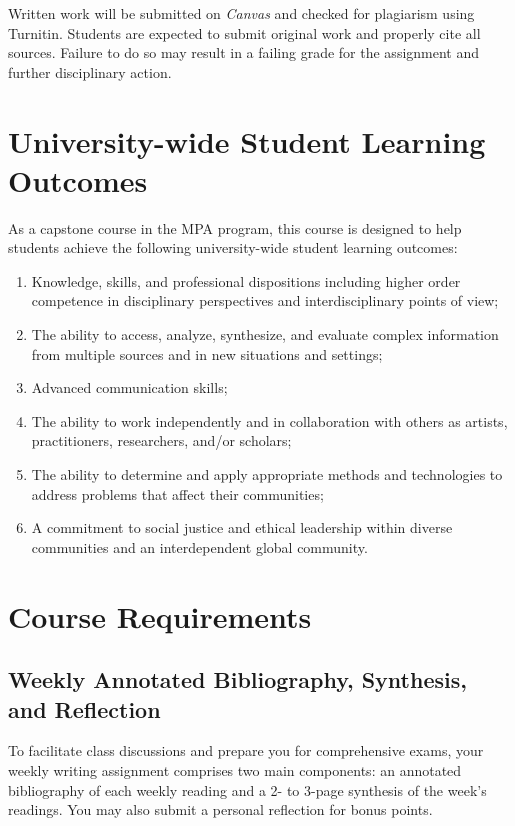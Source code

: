 \documentclass[12pt, letterpaper]{article}
\begin{document}
\vspace{1ex}  

\noindent Written work will be submitted on \emph{Canvas} and checked for plagiarism using Turnitin. Students are expected to submit original work and properly cite all sources. Failure to do so may result in a failing grade for the assignment and further disciplinary action.

\section{University-wide Student Learning Outcomes}
As a capstone course in the MPA program, this course is designed to help students achieve the following university-wide student learning outcomes:
\begin{enumerate}
    \item Knowledge, skills, and professional dispositions including higher order competence in disciplinary perspectives and interdisciplinary points of view;
    \item The ability to access, analyze, synthesize, and evaluate complex information from multiple sources and in new situations and settings;
    \item Advanced communication skills;
    \item The ability to work independently and in collaboration with others as artists, practitioners, researchers, and/or scholars;
    \item The ability to determine and apply appropriate methods and technologies to address problems that affect their communities; 
    \item A commitment to social justice and ethical leadership within diverse communities and an interdependent global community.
\end{enumerate}


\section{Course Requirements}

\subsection*{Weekly Annotated Bibliography, Synthesis, and Reflection}

To facilitate class discussions and prepare you for comprehensive exams, your weekly writing assignment comprises two main components: an annotated bibliography of each weekly reading and a 2- to 3-page synthesis of the week's readings. You may also submit a personal reflection for bonus points. 
\end{document}

